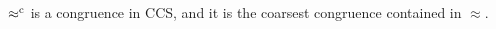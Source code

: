 \begin{theorem}
\label{t:rapproxCongruence}
$\mathrel{\approx^{\rm{c}}}$ is a congruence in CCS, and it is the
coarsest congruence contained in $\approx$.
\end{theorem}




